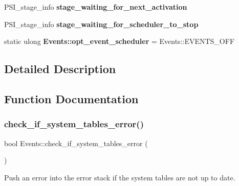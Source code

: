 \begin{DoxyCompactItemize}
P\+S\+I\+\_\+stage\+\_\+info {\bfseries stage\+\_\+waiting\+\_\+for\+\_\+next\+\_\+activation}
\item 
\mbox{\label{group__Event__Scheduler_gaf3efe154579389be46af2cd9aaba9f54}} 
P\+S\+I\+\_\+stage\+\_\+info {\bfseries stage\+\_\+waiting\+\_\+for\+\_\+scheduler\+\_\+to\+\_\+stop}
\item 
\mbox{\label{group__Event__Scheduler_gabb9e1881c4dcbdecbab77a6e6b77f02b}} 
static ulong {\bfseries Events\+::opt\+\_\+event\+\_\+scheduler} = Events\+::\+E\+V\+E\+N\+T\+S\+\_\+\+O\+FF
\end{DoxyCompactItemize}


\subsection{Detailed Description}


\subsection{Function Documentation}
\mbox{\label{group__Event__Scheduler_ga97efaefcec61d1bb9b7e0c518c1319ce}} 
\subsubsection{\texorpdfstring{check\+\_\+if\+\_\+system\+\_\+tables\+\_\+error()}{check\_if\_system\_tables\_error()}}
{\footnotesize\ttfamily bool Events\+::check\+\_\+if\+\_\+system\+\_\+tables\+\_\+error (\begin{DoxyParamCaption}{ }\end{DoxyParamCaption})\hspace{0.3cm}{\ttfamily [static]}}

Push an error into the error stack if the system tables are not up to date. \mbox{\label{group__Event__Scheduler_gacea1505a895adc5f905dc86bc046b29f}} 
